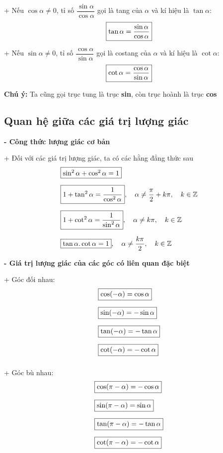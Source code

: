 + Nếu $\cos\alpha\neq0$, tỉ số $\dfrac{\sin\alpha}{\cos\alpha}$ gọi là tang của $\alpha$ và kí hiệu là $\tan\alpha$:
\[
\fbox{$\tan\alpha=\dfrac{\sin\alpha}{\cos\alpha}$}
\]

+ Nếu $\sin\alpha\neq0$, tỉ số $\dfrac{\cos\alpha}{\sin\alpha}$ gọi là costang của $\alpha$ và kí hiệu là $\cot\alpha$:
\[
\fbox{$\cot\alpha=\dfrac{\cos\alpha}{\sin\alpha}$}
\]

\noindent\textbf{Chú ý:} Ta cũng gọi trục tung là trục \textbf{sin}, còn trục hoành là trục \textbf{cos}

\subsection{Quan hệ giữa các giá trị lượng giác}

\noindent\textbf{- Công thức lượng giác cơ bản}\\

\par
+ Đối với các giá trị lượng giác, ta có các hằng đẳng thức sau\\
\[
    \begin{aligned}
        &\fbox{$\sin^2\alpha+\cos^2\alpha=1$}\\[6pt]
        &\fbox{$1+\tan^2\alpha=\dfrac{1}{\cos^2\alpha}$},\quad \alpha\neq\dfrac{\pi}{2}+k\pi,\quad k\in\mathbb{Z}\\[6pt]
        &\fbox{$1+\cot^2\alpha=\dfrac{1}{\sin^2\alpha}$},\quad \alpha\neq k\pi,\quad k\in\mathbb{Z}\\[6pt]
        &\fbox{$\tan\alpha.\cot\alpha=1$}, \quad \alpha \neq \dfrac{k\pi}{2}, \quad k \in \mathbb{Z}
    \end{aligned}
\]

\noindent\textbf{- Giá trị lượng giác của các góc có liên quan đặc biệt}
\par
+ Góc đối nhau:
\[
    \begin{aligned}
        &\fbox{$\cos(-\alpha)=\cos\alpha$}\\[6pt]
        &\fbox{$\sin(-\alpha)=-\sin\alpha$}\\[6pt]
        &\fbox{$\tan(-\alpha)=-\tan\alpha$}\\[6pt]
        &\fbox{$\cot(-\alpha)=-\cot\alpha$}\\[6pt]
    \end{aligned}
\]

+ Góc bù nhau:
\[
    \begin{aligned}
        &\fbox{$\cos(\pi-\alpha)=-\cos\alpha$}\\[6pt]
        &\fbox{$\sin(\pi-\alpha)=\sin\alpha$}\\[6pt]
        &\fbox{$\tan(\pi-\alpha)=-\tan\alpha$}\\[6pt]
        &\fbox{$\cot(\pi-\alpha)=-\cot\alpha$}\\[6pt]
    \end{aligned}
\]


